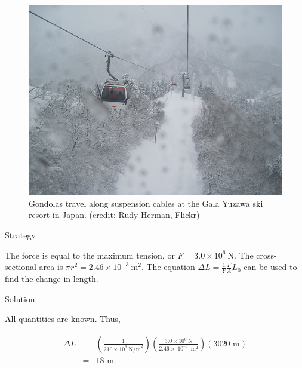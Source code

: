 \documentclass[
]{book}
\newenvironment{tinysection}{}{}
\begin{document}
\begin{figure}
\hypertarget{import-auto-id1165298535463}{%
\centering
\includegraphics{images/Figure_06_03_04a.jpg}
\caption{Gondolas travel along suspension cables at the Gala Yuzawa ski resort
in Japan. (credit: Rudy Herman,
Flickr)}\label{import-auto-id1165298535463}
}
\end{figure}

\begin{tinysection}

{Strategy}

\end{tinysection}

The force is equal to the maximum tension, or
\({{F = 3}\text{.}{0 \times \text{10}^{6}}\ \text{N}}{}\). The
cross-sectional area is
\({{{\pi r}^{2} = 2}\text{.}{\text{46} \times \text{10}^{- 3}}\ \text{m}^{2}}{}\).
The equation \({{\Delta L = \frac{1}{Y}}\frac{F}{A}L_{0}}{}\) can be used
to find the change in length.

\begin{tinysection}

{Solution}

\end{tinysection}

All quantities are known. Thus,

\leavevmode\hypertarget{eip-657}{}%
\[\begin{array}{lll}
{\Delta L} & = & {\left( \frac{1}{{\text{210} \times \text{10}^{9}}\ \text{N/m}^{2}} \right)\left( \frac{3\text{.}{0 \times \text{10}^{6}\ }\text{N}}{2.46 \times \operatorname{10}^{–3}\ \text{m}^{2}} \right)\left( \text{3020\ m} \right)} \\
 & = & {\text{18\ m}.} \\
\end{array}{}\]
\end{document}
